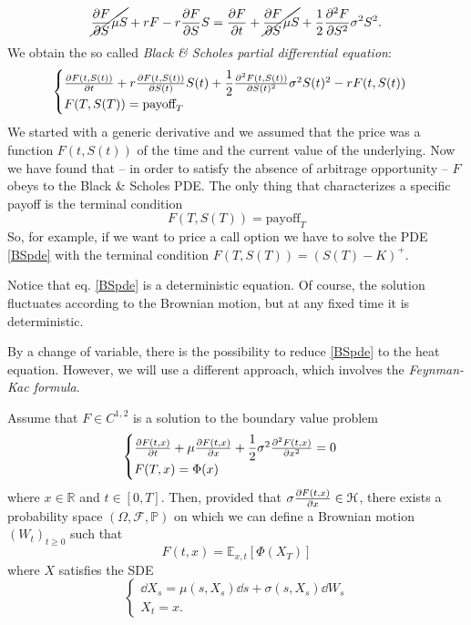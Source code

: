 \begin{equation*}
    \cancel{\pdv{F}{S}\mu S} + rF - r\pdv{F}{S} S = \pdv{F}{t} + \cancel{\pdv{F}{S}\mu S} + \dfrac{1}{2}\pdv[2]{F}{S}\sigma^2S^2.
\end{equation*}
We obtain the so called \emph{Black \& Scholes partial differential equation}:
\begin{equation}\label{BSpde}
    \begin{cases}
    \pdv{F(t,S(t))}{t} + r\pdv{F(t,S(t))}{S(t)} S(t) + \dfrac{1}{2}\pdv[2]{F(t,S(t))}{S(t)}\sigma^2S(t)^2 - rF(t,S(t))\\
    F(T,S(T)) = \mbox{payoff}_T
    \end{cases}
\end{equation}
We started with a generic derivative and we assumed that the price was a function $F(t,S(t))$ of the time and the current value of the underlying. Now we have found that -- in order to satisfy the absence of arbitrage opportunity -- $F$ obeys to the Black \& Scholes PDE. The only thing that characterizes a specific payoff is the terminal condition
\begin{equation}
    F(T,S(T)) = \mbox{payoff}_T
\end{equation}
So, for example, if we want to price a call option we have to solve the PDE \eqref{BSpde} with the terminal condition $F(T,S(T))=(S(T)-K)^+$.
\begin{remark}
    Notice that eq. \eqref{BSpde} is a deterministic equation. Of course, the solution fluctuates according to the Brownian motion, but at any fixed time it is deterministic.
\end{remark}
By a change of variable, there is the possibility to reduce \eqref{BSpde} to the heat equation. However, we will use a different approach, which involves the \emph{Feynman-Kac formula}.
\begin{theorem}
    Assume that $F\in C^{1,2}$ is a solution to the boundary value problem
    \begin{equation}\label{bvp}
        \begin{cases}
        \pdv{F(t,x)}{t} + \mu\pdv{F(t,x)}{x} + \dfrac{1}{2}\sigma^2\pdv[2]{F(t,x)}{x}=0\\
        F(T,x) = \Phi(x)
        \end{cases}
    \end{equation}
    where $x\in\mathbb{R}$ and $t\in[0,T]$. Then, provided that $\sigma\pdv{F(t,x)}{x}\in\mathcal{H}$, there exists a probability space $(\Omega,\mathcal{F},\mathbb{P})$ on which we can define a Brownian motion $(W_t)_{t\ge0}$ such that
    \begin{equation}
        F(t,x) = \mathbb{E}_{x,t}[\Phi(X_T)]
    \end{equation}
    where $X$ satisfies the SDE
    \begin{equation}\label{fk}
        \begin{cases}
        \dd X_s = \mu(s, X_s)\dd s + \sigma(s, X_s)\dd W_s\\
        X_t = x.
        \end{cases}
    \end{equation}
\end{theorem}
